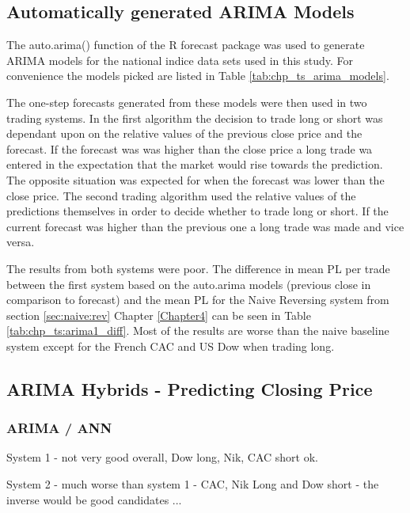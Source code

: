 \subsection{Automatically generated ARIMA Models}
The auto.arima() function of the R forecast package was used to generate ARIMA models for the national indice data sets used in this study. For convenience the models picked are listed in Table \ref{tab:chp_ts_arima_models}.



The one-step forecasts generated from these models were then used in two trading systems. In the first algorithm the decision to trade long or short was dependant upon on the relative values of the previous close price and the forecast. If the forecast was was higher than the close price a long trade wa entered in the expectation that the market would rise towards the prediction. The opposite situation was expected for when the forecast was lower than the close price. The second trading algorithm used the relative values of the predictions themselves in order to decide whether to trade long or short. If the current forecast was higher than the previous one a long trade was made and vice versa.

The results from both systems were poor. The difference in mean PL per trade between the first system based on the auto.arima models (previous close in comparison to forecast) and the mean PL for the Naive Reversing system from section \ref{sec:naive:rev} Chapter \ref{Chapter4} can be seen in Table \ref{tab:chp_ts:arima1_diff}. Most of the results are worse than the naive baseline system except for the French CAC and US Dow when trading long.



\subsection{ARIMA Hybrids - Predicting Closing Price}

\subsubsection{ARIMA / ANN}

System 1 - not very good overall, Dow long, Nik, CAC short ok.

System 2 - much worse than system 1 - CAC, Nik Long and Dow short - the inverse would be good candidates ...


